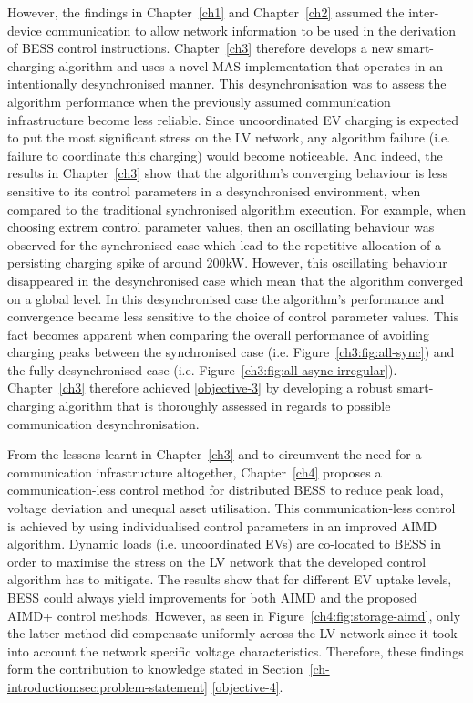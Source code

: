 However, the findings in Chapter~\ref{ch1} and Chapter~\ref{ch2} assumed the inter-device communication to  allow network information to be used in the derivation of BESS control instructions.
Chapter~\ref{ch3} therefore develops a new smart-charging algorithm and uses a novel MAS implementation that operates in an intentionally desynchronised manner.
This desynchronisation was to assess the algorithm performance when  the previously assumed communication infrastructure become less reliable.
Since uncoordinated EV charging is expected to put the most significant stress on the LV network, any algorithm failure (i.e. failure to coordinate this charging) would become noticeable.
And indeed, the results in Chapter~\ref{ch3} show that the algorithm's converging behaviour is less sensitive to its control parameters in a desynchronised environment, when compared to the traditional synchronised algorithm execution.
For example, when choosing extrem control parameter values, then an oscillating behaviour was observed for the synchronised case which lead to the repetitive allocation of a persisting charging spike of around 200kW.
However, this oscillating behaviour disappeared in the desynchronised case which mean that the algorithm converged on a global level.
In this desynchronised case the algorithm's performance and convergence became less sensitive to the choice of control parameter values.
This fact becomes apparent when comparing the overall performance of avoiding charging peaks between the synchronised case (i.e. Figure~\ref{ch3:fig:all-sync}) and the fully desynchronised case (i.e. Figure~\ref{ch3:fig:all-async-irregular}).
Chapter~\ref{ch3} therefore achieved \ref{objective-3} by developing a robust smart-charging algorithm that is thoroughly assessed in regards to possible communication desynchronisation.

From the lessons learnt in Chapter~\ref{ch3} and to circumvent the need for a communication infrastructure altogether, Chapter~\ref{ch4} proposes a communication-less control method for distributed BESS to reduce peak load, voltage deviation and unequal asset utilisation.
This communication-less control is achieved by using individualised control parameters in an improved AIMD algorithm.
Dynamic loads (i.e. uncoordinated EVs) are co-located to BESS in order to maximise the stress on the LV network that the developed control algorithm has to mitigate.
The results show that for different EV uptake levels, BESS could always yield improvements for both AIMD and the proposed AIMD+ control methods.
However, as seen in Figure~\ref{ch4:fig:storage-aimd}, only the latter method did compensate uniformly across the LV network since it took into account the network specific voltage characteristics.
Therefore, these findings form the contribution to knowledge stated in Section~\ref{ch-introduction:sec:problem-statement} \ref{objective-4}.

